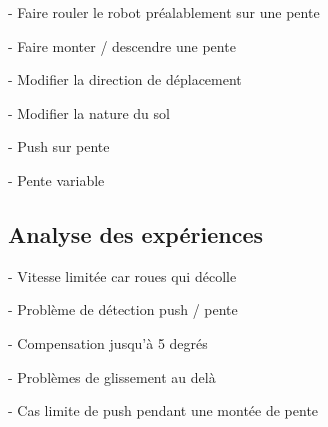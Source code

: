 			- Faire rouler le robot préalablement sur une pente
			
			- Faire monter / descendre une pente
			
			- Modifier la direction de déplacement
			
			- Modifier la nature du sol
			
			- Push sur pente
			
			- Pente variable
		
		\subsection{Analyse des expériences}
		
			- Vitesse limitée car roues qui décolle
			
			- Problème de détection push / pente
			
			- Compensation jusqu'à 5 degrés
			
			- Problèmes de glissement au delà
			
			- Cas limite de push pendant une montée de pente
		